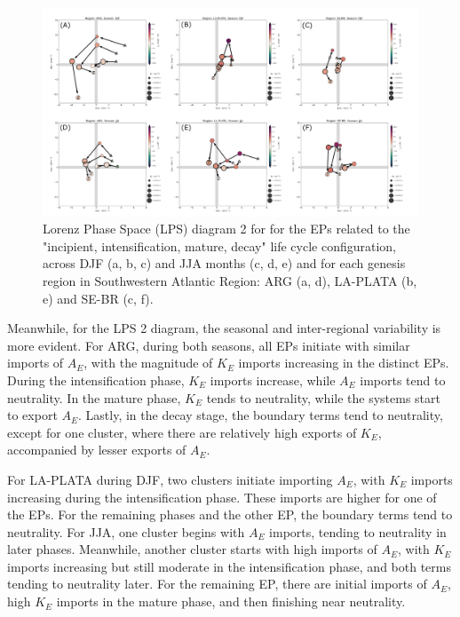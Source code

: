 \begin{figure}[!htbp]
\centering
\includegraphics[width=\textwidth]{figs_6/lps_imports_clusters_IcItDM_seasons_regions.pdf}
\caption[LPS 2 - Clusters - Seasonality and Spatial Variability]{Lorenz Phase Space (LPS) diagram 2 for for the EPs related to the "incipient, intensification, mature, decay" life cycle configuration, across DJF (a, b, c) and JJA months (c, d, e) and for each genesis region in Southwestern Atlantic Region: ARG (a, d), LA-PLATA (b, e) and SE-BR (c, f).}
\label{fig:lps_imports_clusters_IcItDM_seasons_regions}
\end{figure}

Meanwhile, for the LPS 2 diagram, the seasonal and inter-regional variability is more evident. For ARG, during both seasons, all EPs initiate with similar imports of $A_E$, with the magnitude of $K_E$ imports increasing in the distinct EPs. During the intensification phase, $K_E$ imports increase, while $A_E$ imports tend to neutrality. In the mature phase, $K_E$ tends to neutrality, while the systems start to export $A_E$. Lastly, in the decay stage, the boundary terms tend to neutrality, except for one cluster, where there are relatively high exports of $K_E$, accompanied by lesser exports of $A_E$.

For LA-PLATA during DJF, two clusters initiate importing $A_E$, with $K_E$ imports increasing during the intensification phase. These imports are higher for one of the EPs. For the remaining phases and the other EP, the boundary terms tend to neutrality. For JJA, one cluster begins with $A_E$ imports, tending to neutrality in later phases. Meanwhile, another cluster starts with high imports of $A_E$, with $K_E$ imports increasing but still moderate in the intensification phase, and both terms tending to neutrality later. For the remaining EP, there are initial imports of $A_E$, high $K_E$ imports in the mature phase, and then finishing near neutrality.


